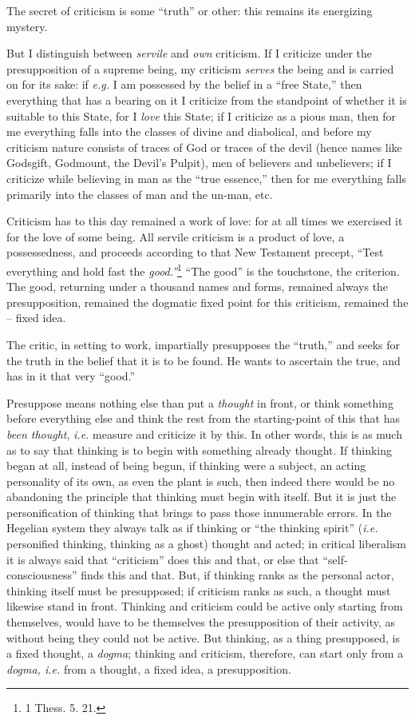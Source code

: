 \documentclass[12pt,a4paper]{book}
\begin{document}
The secret of criticism is some ``truth'' or other: this remains its 
energizing mystery.

But I distinguish between \textit{servile} and \textit{own} criticism. If I 
criticize under the presupposition of a supreme being, my criticism 
\textit{serves} the being and is carried on for its sake: if \textit{e.g.} I 
am possessed by the belief in a ``free State,'' then everything that has a 
bearing on it I criticize from the standpoint of whether it is suitable to 
this State, for I \textit{love} this State; if I criticize as a pious man, 
then for me everything falls into the classes of divine and diabolical, and 
before my criticism nature consists of traces of God or traces of the devil 
(hence names like Godsgift, Godmount, the Devil's Pulpit), men of believers 
and unbelievers; if I criticize while believing in man as the ``true 
essence,'' then for me everything falls primarily into the classes of man and 
the un-man, etc.

Criticism has to this day remained a work of love: for at all times we 
exercised it for the love of some being. All servile criticism is a product of 
love, a possessedness, and proceeds according to that New Testament precept, 
``Test everything and hold fast the \textit{good.''}\footnote{1 Thess. 5. 
21.} ``The good'' is the touchstone, the criterion. The good, returning 
under a thousand names and forms, remained always the presupposition, remained 
the dogmatic fixed point for this criticism, remained the -- fixed idea.

The critic, in setting to work, impartially presupposes the ``truth,'' and 
seeks for the truth in the belief that it is to be found. He wants to 
ascertain the true, and has in it that very ``good.''

Presuppose means nothing else than put a \textit{thought} in front, or think 
something before everything else and think the rest from the starting-point of 
this that has \textit{been thought}, \textit{i.e.} measure and criticize it by 
this. In other words, this is as much as to say that thinking is to begin with 
something already thought. If thinking began at all, instead of being begun, 
if thinking were a subject, an acting personality of its own, as even the 
plant is such, then indeed there would be no abandoning the principle that 
thinking must begin with itself. But it is just the personification of 
thinking that brings to pass those innumerable errors. In the Hegelian system 
they always talk as if thinking or ``the thinking spirit'' (\textit{i.e.} 
personified thinking, thinking as a ghost) thought and acted; in critical 
liberalism it is always said that ``criticism'' does this and that, or else 
that ``self- consciousness'' finds this and that. But, if thinking ranks as 
the personal actor, thinking itself must be presupposed; if criticism ranks as 
such, a thought must likewise stand in front. Thinking and criticism could be 
active only starting from themselves, would have to be themselves the 
presupposition of their activity, as without being they could not be active. 
But thinking, as a thing presupposed, is a fixed thought, a \textit{dogma}; 
thinking and criticism, therefore, can start only from a \textit{dogma, i.e.} 
from a thought, a fixed idea, a presupposition.
\end{document}
